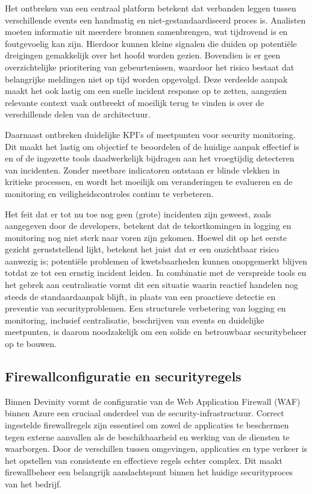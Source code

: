 Het ontbreken van een centraal platform betekent dat verbanden leggen tussen verschillende events een handmatig en niet-gestandaardiseerd proces is. Analisten moeten informatie uit meerdere bronnen samenbrengen, wat tijdrovend is en foutgevoelig kan zijn. Hierdoor kunnen kleine signalen die duiden op potentiële dreigingen gemakkelijk over het hoofd worden gezien. Bovendien is er geen overzichtelijke prioritering van gebeurtenissen, waardoor het risico bestaat dat belangrijke meldingen niet op tijd worden opgevolgd. Deze verdeelde aanpak maakt het ook lastig om een snelle incident response op te zetten, aangezien relevante context vaak ontbreekt of moeilijk terug te vinden is over de verschillende delen van de architectuur.

Daarnaast ontbreken duidelijke KPI’s of meetpunten voor security monitoring. Dit maakt het lastig om objectief te beoordelen of de huidige aanpak effectief is en of de ingezette tools daadwerkelijk bijdragen aan het vroegtijdig detecteren van incidenten. Zonder meetbare indicatoren ontstaan er blinde vlekken in kritieke processen, en wordt het moeilijk om veranderingen te evalueren en de monitoring en veiligheidscontroles continu te verbeteren.

Het feit dat er tot nu toe nog geen (grote) incidenten zijn geweest, zoals aangegeven door de developers, betekent dat de tekortkomingen in logging en monitoring nog niet sterk naar voren zijn gekomen. Hoewel dit op het eerste gezicht geruststellend lijkt, betekent het juist dat er een onzichtbaar risico aanwezig is; potentiële problemen of kwetsbaarheden kunnen onopgemerkt blijven totdat ze tot een ernstig incident leiden. In combinatie met de verspreide tools en het gebrek aan centralisatie vormt dit een situatie waarin reactief handelen nog steeds de standaardaanpak blijft, in plaats van een proactieve detectie en preventie van securityproblemen. Een structurele verbetering van logging en monitoring, inclusief centralisatie, beschrijven van events en duidelijke meetpunten, is daarom noodzakelijk om een solide en betrouwbaar securitybeheer op te bouwen.


\subsection{Firewallconfiguratie en securityregels}
Binnen Devinity vormt de configuratie van de Web Application Firewall (WAF) binnen Azure een cruciaal onderdeel van de security-infrastructuur. Correct ingestelde firewallregels zijn essentieel om zowel de applicaties te beschermen tegen externe aanvallen als de beschikbaarheid en werking van de diensten te waarborgen. Door de verschillen tussen omgevingen, applicaties en type verkeer is het opstellen van consistente en effectieve regels echter complex. Dit maakt firewallbeheer een belangrijk aandachtspunt binnen het huidige securityproces van het bedrijf.

